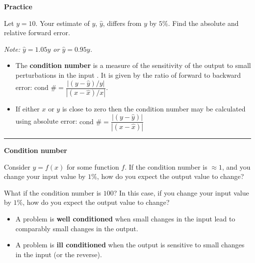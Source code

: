 \documentclass[12pt,letterpaper,noanswers]{exam}
\begin{document}
\noindent\textbf{Practice}

Let $y = 10$.  Your estimate of $y$, $\hat{y}$, differs from $y$ by $5\%$.  Find the absolute and relative forward error.  

\emph{Note: $\hat{y} = 1.05 y$ or $\hat{y} = 0.95 y$.}

\begin{tcolorbox}
\begin{itemize}
\itemsep0pt
\item The \textbf{condition number} is a measure of the sensitivity of the output to small perturbations in the input \cite{higham2020condition}.  It is given by the ratio of forward to backward error: $\text{cond } \# = \dfrac{\left\vert (y - \hat{y})/y\right\vert}{\left\vert (x - \hat{x})/x\right\vert}$.  

\item If either $x$ or $y$ is close to zero then the condition number may be calculated using absolute error: $\text{cond } \#=\dfrac{\left\vert (y - \hat{y})\right\vert}{\left\vert (x - \hat{x})\right\vert}$
\end{itemize}

\end{tcolorbox}


\vspace{0.2cm}
\hrule
\vspace{0.2cm}

\noindent \textbf{Condition number}

Consider $y = f(x)$ for some function $f$.  If the condition number is $\approx 1$, and you change your input value by $1\%$, how do you expect the output value to change?

\vspace{0.5in}


What if the condition number is $100$?  In this case, if you change your input value by $1\%$, how do you expect the output value to change?

\vspace{0.5in}


\begin{tcolorbox}
\begin{itemize}
\itemsep0pt
\item A problem is \textbf{well conditioned} when small changes in the input lead to comparably small changes in the output.

\item A problem is \textbf{ill conditioned} when the output is sensitive to small changes in the input (or the reverse).
\end{itemize}

\end{tcolorbox}
\end{document}
